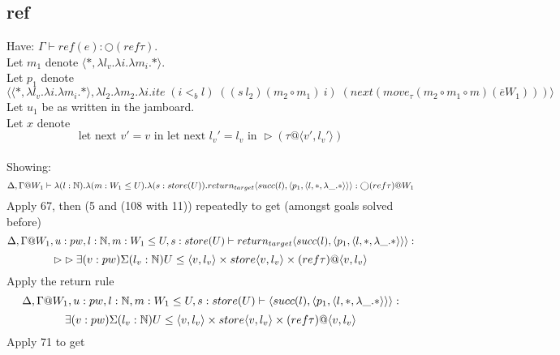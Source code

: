 \documentclass{article}
\begin{document}

%

\subsection{ref}
Have: $\Gamma \vdash ref(e) : \bigcirc(ref \tau )$. \\
Let $m_1$ denote $ \langle *, \lambda l_v. \lambda i. \lambda m_i. * \rangle$.\\
Let $p_1$ denote
\[\langle \langle *, \lambda l_v. \lambda i. \lambda m_i. * \rangle , \lambda l_2. \lambda m_2. \lambda i. ite \; (i <_b l) \;
((s \: l_2) (m_2 \circ m_1)\: i) \; (next
(move_{\tau}(m_2 \circ m_1 \circ m) 
(\overline{e} W_1)))
\rangle\]
Let $u_1$ be as written in the jamboard.\\
Let $x$ denote \[\text{let next }v' = v \text{ in let next } l_v' = l_v \text{ in } \rhd(\tau @ \langle v', l_v' \rangle)\]
\\
Showing: \[\Delta, \Gamma@W_1 \vdash \lambda (l : \N). \lambda (m: W_1 \leq U). \lambda (s: store(U)).return_{target} \langle succ(l), \langle p_1, \langle l, *, \lambda \_. *
\rangle \rangle \rangle : \bigcirc (ref \tau ) @ W_1\]
Apply 67, then (5 and (108 with 11)) repeatedly to get (amongst goals solved before)
\[\Delta, \Gamma@W_1, u: pw, l: \N, m: W_1 \leq U, s: store(U) \vdash return_{target} \langle succ(l), \langle p_1, \langle l, *, \lambda \_. *
\rangle \rangle \rangle :\] 
\[\rhd \rhd \exists(v: pw)\Sigma(l_v: \mathbb{N}) U \leq \langle v, l_v \rangle \times store\langle v, l_v \rangle \times (ref \tau)@\langle v, l_v \rangle
\]
Apply the return rule 
\[\Delta, \Gamma@W_1, u: pw, l: \N, m: W_1 \leq U, s: store(U) \vdash  \langle succ(l), \langle p_1, \langle l, *, \lambda \_. *
\rangle \rangle \rangle :\] \[\exists(v: pw)\Sigma(l_v: \mathbb{N}) U \leq \langle v, l_v \rangle \times store\langle v, l_v \rangle \times (ref \tau)@\langle v, l_v \rangle\] 
Apply 71 to get
\end{document}
